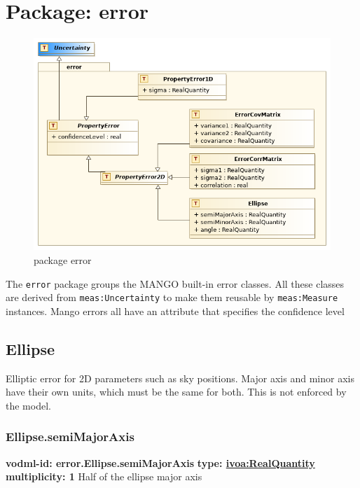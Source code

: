 \pagebreak
\section{Package: error }
  \begin{figure}[h]
    \includegraphics[width=1.0\textwidth]{../model/error.png}
    \caption{package error}
    \label{fig:error}
  \end{figure}




  The \texttt{error} package groups the MANGO built-in error classes. All these classes are derived from \texttt{meas:Uncertainty} to make them reusable by \texttt{meas:Measure} instances. Mango errors all have an attribute that specifies the confidence level

  \subsection{Ellipse}
  \label{sect:error.Ellipse}
    Elliptic error for 2D parameters such as sky positions. Major axis and minor axis have their own units, which must be the same for both. This is not enforced by the model.

    \subsubsection{Ellipse.semiMajorAxis}
      \textbf{vodml-id: error.Ellipse.semiMajorAxis} \newline
      \textbf{type: \hyperref[sect:ivoa]{ivoa:RealQuantity}} \newline
      \textbf{multiplicity: 1} \newline
      Half of the ellipse major axis

